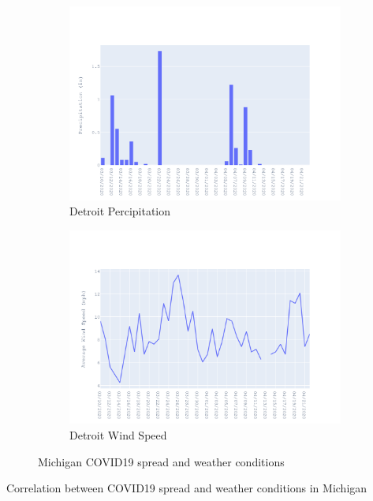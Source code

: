 \documentclass{homework}
\begin{document}
\begin{figure}[H]
  \begin{subfigure}{0.45\linewidth}
    \includegraphics[width=\linewidth]{task4/Michigan_rain.png}
    \caption{Detroit Percipitation}
  \end{subfigure}
  \hfil
  \begin{subfigure}{0.45\linewidth}
    \includegraphics[width=\linewidth]{task4/Michigan_wnd.png}
    \caption{Detroit Wind Speed}
  \end{subfigure}

  \caption{Michigan COVID19 spread and weather conditions}
  \label{fig:task4CA}
\end{figure}

\begin{table}[H]
  \caption{Correlation between COVID19 spread and weather conditions in Michigan}
  \label{Task 4 Michigan}
  \centering
  
\end{table}
\end{document}
